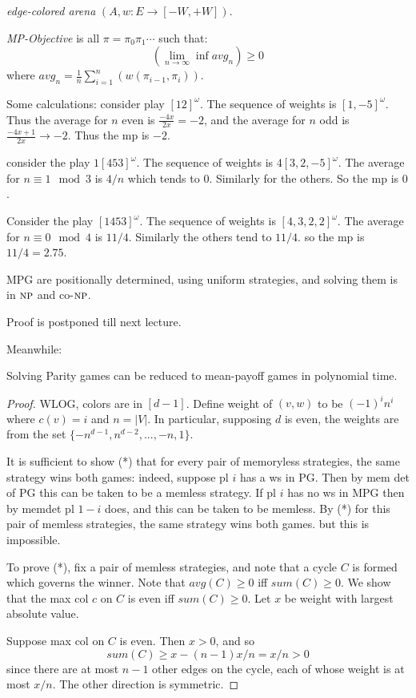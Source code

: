 \documentclass[a4paper,10pt]{article}
\begin{document}
\emph{edge-colored arena} $(A,w:E \to [-W,+W])$. 

\emph{MP-Objective} is all $\pi = \pi_0 \pi_1 \cdots$ such that:
\[
(\lim_{n \to \infty} \inf avg_n) \geq 0
\]
where $avg_n = \frac{1}{n}\sum_{i=1}^n (w(\pi_{i-1},\pi_{i}))$.

Some calculations: consider play $[12]^\omega$. The sequence of weights is $[1,-5]^\omega$. Thus the 
average for $n$ even is $\frac{-4x}{2x} = -2$, and the average for $n$ odd is $\frac{-4x+1}{2x} \to -2$. 
Thus the mp is $-2$.

consider the play $1[453]^\omega$. The sequence of weights is $4 [3,2,-5]^\omega$. The average for $n \equiv 1 \mod 3$ 
is $4/n$ which tends to $0$. Similarly for the others. So the mp is $0$.

Consider the play $[1453]^\omega$. The sequence of weights is $[4,3,2,2]^\omega$. The average for $n \equiv 0 \mod 4$ is 
$11/4$. Similarly the others tend to $11/4$. so the mp is $11/4 = 2.75$.

\begin{theorem}
 MPG are positionally determined, using uniform strategies, and solving them is in $\textsc{np}$ and co-$\textsc{np}$.
\end{theorem}

Proof is postponed till next lecture.

Meanwhile:
\begin{proposition}
 Solving Parity games can be reduced to mean-payoff games in polynomial time.
\end{proposition}
\begin{proof}
 WLOG, colors are in $[d-1]$. Define weight of $(v,w)$ to be $(-1)^i n^i$ where $c(v) = i$ and $n = |V|$. 
 In particular, supposing $d$ is even, the weights are from the set $\{-n^{d-1}, n^{d-2}, ..., -n, 1\}$.
 
 
 It is sufficient to show (*) that for every pair of memoryless strategies, the same strategy wins both games: indeed, 
 suppose pl $i$ has a ws in PG. Then by mem det of PG this can be taken to be a memless strategy. If pl $i$ has no ws in MPG 
 then by memdet pl $1-i$ does, and this can be taken to be memless. By (*) for this pair of memless strategies, 
 the same strategy wins both games. but this is impossible.
 
 To prove (*), fix a pair of memless strategies, and note that a cycle $C$ is formed which governs the winner. 
 Note that $avg(C) \geq 0$ iff $sum(C) \geq 0$. We show that the max col $c$ on $C$ is even iff $sum(C) \geq 0$.
 Let $x$ be weight with largest absolute value. 
 
 Suppose max col on $C$ is even. Then $x > 0$, and so 
 \[sum(C) \geq  x - (n-1)x/n = x/n > 0
 \]
 since there are at most $n-1$ other edges on the cycle, each of whose weight is at most $x/n$.
 The other direction is symmetric.
\end{proof}
\end{document}
